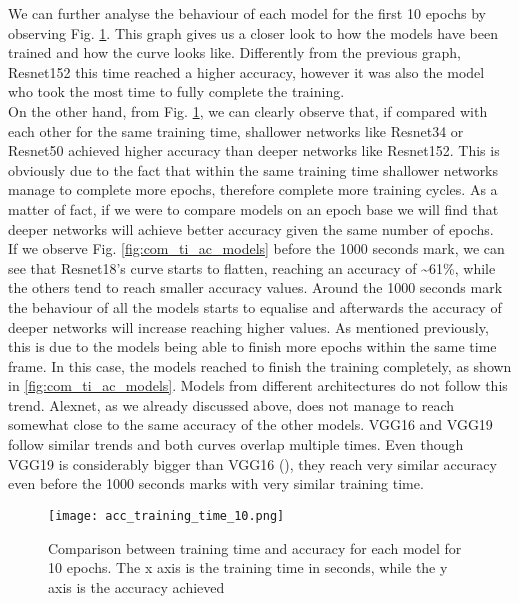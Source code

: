 We can further analyse the behaviour of each model for the first 10 epochs by observing Fig. \ref{fig:acc_training_10}. This graph gives us a closer look to how the models have been trained and how the curve looks like. Differently from the previous graph, Resnet152 this time reached a higher accuracy, however it was also the model who took the most time to fully complete the training.\\
On the other hand, from Fig. \ref{fig:acc_training_10}, we can clearly observe  that, if compared with each other for the same training time, shallower networks like Resnet34 or Resnet50 achieved higher accuracy than deeper networks like Resnet152. This is obviously due to the fact that within the same training time shallower networks manage to complete more epochs, therefore complete more training cycles. As a matter of fact, if we were to compare models on an epoch base we will find that deeper networks will achieve better accuracy given the same number of epochs. \\
If we observe Fig. \ref{fig:com_ti_ac_models} before the 1000 seconds mark, we can see that Resnet18's curve starts to flatten, reaching an accuracy of \textasciitilde 61\%, while the others tend to reach smaller accuracy values. Around the 1000 seconds mark the behaviour of all the models starts to equalise and afterwards the accuracy of deeper networks will increase reaching higher values. As mentioned previously, this is due to the models being able to finish more epochs within the same time frame. In this case, the models reached to finish the training completely, as shown in \ref{fig:com_ti_ac_models}. 
Models from different architectures do not follow this trend. Alexnet, as we already discussed above, does not manage to reach somewhat close to the same accuracy of the other models. VGG16 and VGG19 follow similar trends and both curves overlap multiple times.  Even though VGG19 is considerably bigger than VGG16 (\cite{simonyan2015deep}), they reach very similar accuracy even before the 1000 seconds marks with very similar training time. \\
\begin{figure}[h]
       \centering 
	    \texttt{[image: acc\_training\_time\_10.png]}
        \caption[Comparison between training time and accuracy for each model for 10 epochs]{Comparison between training time and accuracy for each model for 10 epochs. The x axis is the training time in seconds, while the y axis is the accuracy achieved}
         \label{fig:acc_training_10}
\end{figure}


